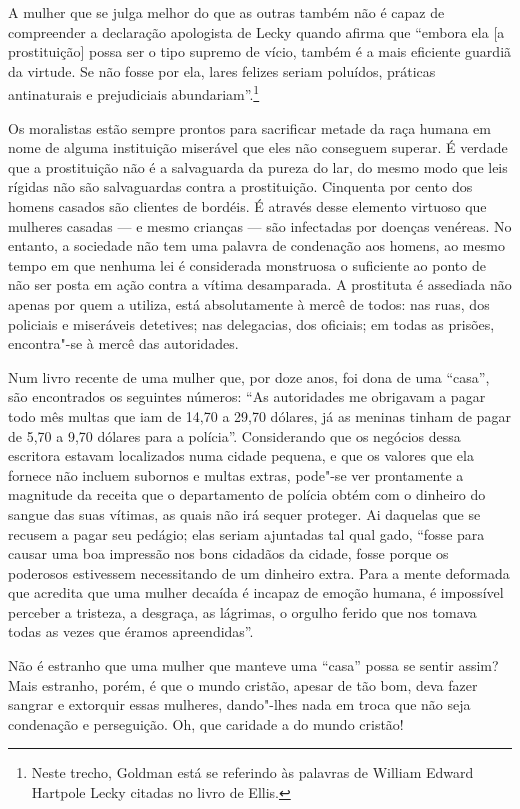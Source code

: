 A mulher que se julga melhor do que as outras também não é capaz de compreender a
declaração apologista de Lecky quando afirma que ``embora ela {[}a
prostituição{]} possa ser o tipo supremo de vício, também é a mais
eficiente guardiã da virtude. Se não fosse por ela, lares felizes seriam
poluídos, práticas antinaturais e prejudiciais abundariam''.\footnote{Neste
  trecho, Goldman está se referindo às palavras de William Edward
  Hartpole Lecky citadas no livro de Ellis.}

Os moralistas estão sempre prontos para sacrificar metade da raça humana
em nome de alguma instituição miserável que eles não conseguem superar.
É verdade que a prostituição não é a salvaguarda da pureza do lar, do
mesmo modo que leis rígidas não são salvaguardas contra a prostituição.
Cinquenta por cento dos homens casados são clientes de bordéis. É
através desse elemento virtuoso que mulheres casadas --- e mesmo crianças
--- são infectadas por doenças venéreas. No entanto, a sociedade não tem
uma palavra de condenação aos homens, ao mesmo tempo em que nenhuma lei
é considerada monstruosa o suficiente ao ponto de não ser posta em ação
contra a vítima desamparada. A prostituta é assediada não apenas por quem a utiliza, está absolutamente à mercê de todos: nas ruas, dos policiais e miseráveis detetives; nas delegacias, dos oficiais; em todas as prisões, encontra"-se à mercê das autoridades.

Num livro recente de uma mulher que, por doze anos, foi dona de uma
``casa'', são encontrados os seguintes números: ``As autoridades me
obrigavam a pagar todo mês multas que iam de 14,70 a 29,70 dólares, já as
meninas tinham de pagar de 5,70 a 9,70 dólares para a polícia''.
Considerando que os negócios dessa escritora estavam localizados numa
cidade pequena, e que os valores que ela fornece não incluem subornos e
multas extras, pode"-se ver prontamente a magnitude da receita que o
departamento de polícia obtém com o dinheiro do sangue das suas vítimas,
as quais não irá sequer proteger. Ai daquelas que se recusem a pagar seu
pedágio; elas seriam ajuntadas tal qual gado, ``fosse para causar uma
boa impressão nos bons cidadãos da cidade, fosse porque os poderosos
estivessem necessitando de um dinheiro extra. Para a mente deformada que
acredita que uma mulher decaída é incapaz de emoção humana, é impossível
perceber a tristeza, a desgraça, as lágrimas, o orgulho ferido que nos
tomava todas as vezes que éramos apreendidas''.

Não é estranho que uma mulher que manteve uma ``casa'' possa se sentir
assim? Mais estranho, porém, é que o mundo cristão, apesar de tão bom, deva fazer
sangrar e extorquir essas mulheres, dando"-lhes nada em troca que não
seja condenação e perseguição. Oh, que caridade a do mundo cristão!

